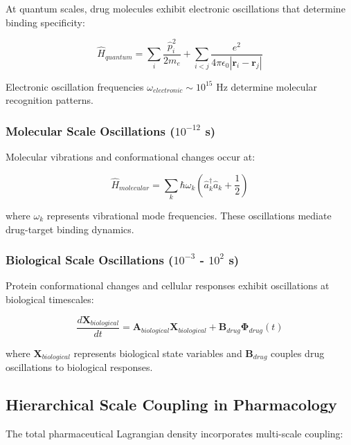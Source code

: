At quantum scales, drug molecules exhibit electronic oscillations that determine binding specificity:

\begin{equation}
\hat{H}_{quantum} = \sum_i \frac{\hat{p}_i^2}{2m_e} + \sum_{i<j} \frac{e^2}{4\pi\epsilon_0 |\mathbf{r}_i - \mathbf{r}_j|}
\end{equation}

Electronic oscillation frequencies $\omega_{electronic} \sim 10^{15}$ Hz determine molecular recognition patterns.

\subsubsection{Molecular Scale Oscillations ($10^{-12}$ s)}

Molecular vibrations and conformational changes occur at:

\begin{equation}
\hat{H}_{molecular} = \sum_k \hbar\omega_k \left(\hat{a}_k^\dagger \hat{a}_k + \frac{1}{2}\right)
\end{equation}

where $\omega_k$ represents vibrational mode frequencies. These oscillations mediate drug-target binding dynamics.

\subsubsection{Biological Scale Oscillations ($10^{-3}$ - $10^2$ s)}

Protein conformational changes and cellular responses exhibit oscillations at biological timescales:

\begin{equation}
\frac{d\mathbf{X}_{biological}}{dt} = \mathbf{A}_{biological} \mathbf{X}_{biological} + \mathbf{B}_{drug} \mathbf{\Phi}_{drug}(t)
\end{equation}

where $\mathbf{X}_{biological}$ represents biological state variables and $\mathbf{B}_{drug}$ couples drug oscillations to biological responses.

\subsection{Hierarchical Scale Coupling in Pharmacology}

The total pharmaceutical Lagrangian density incorporates multi-scale coupling:

